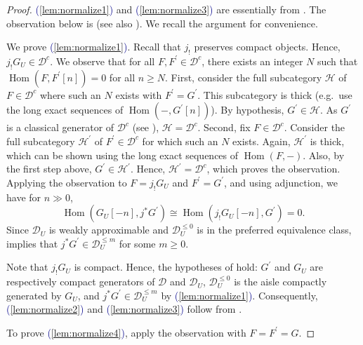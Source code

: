 \documentclass[11pt]{amsart}
\def\eqref#1{\textcolor{darkblue}{(\ref{#1})}}
\theoremstyle{plain}
\theoremstyle{definition}
\numberwithin{equation}{section}
\numberwithin{theorem}{section}
\begin{document}
\begin{proof}
    \eqref{lem:normalize1} and \eqref{lem:normalize3} are essentially from \cite[Lemma 3.11]{Burke/Neeman/Pauwels:2023}.
    The observation below is \cite[Lemma 3.5(2)]{Burke/Neeman/Pauwels:2023} (see also \cite[Lemma A.1]{GuisadoVillaalgordo/Lank:2026}). 
    We recall the argument for convenience.

    We prove \eqref{lem:normalize1}.
    Recall that $j_!$ preserves compact objects.
    Hence, $j_! G_U\in \mathcal{D}^c$.
    We observe that for all $F,F^\prime\in \mathcal{D}^c$, there exists an integer $N$ such that $\operatorname{Hom}(F,F^\prime[n])=0$ for all $n\geq N$.
    First, consider the full subcategory $\mathcal{H}$ of $F\in \mathcal{D}^c$ where such an $N$ exists with $F^\prime = G^\prime$.
    This subcategory is thick (e.g.\ use the long exact sequences of $\operatorname{Hom}(-,G^\prime[n])$). 
    By hypothesis, $G^\prime \in \mathcal{H}$.
    As $G^\prime$ is a classical generator of $\mathcal{D}^c$ (see ), $\mathcal{H} = \mathcal{D}^c$.
    Second, fix $F\in \mathcal{D}^c$. 
    Consider the full subcategory $\mathcal{H}^\prime$ of $F^\prime\in \mathcal{D}^c$ for which such an $N$ exists.
    Again, $\mathcal{H}^\prime$ is thick, which can be shown using the long exact sequences of $\operatorname{Hom}(F,-)$.
    Also, by the first step above, $G^\prime \in \mathcal{H}^\prime$. 
    Hence, $\mathcal{H}^\prime = \mathcal{D}^c$, which proves the observation. 
    Applying the observation to $F = j_! G_U$ and $F^\prime = G^\prime$, and using adjunction, we have for $n\gg 0$,
    \begin{displaymath}
        \operatorname{Hom}(G_U[-n],j^\ast G^\prime)\cong \operatorname{Hom}(j_! G_U[-n],G^\prime) = 0.
    \end{displaymath}
    Since $\mathcal{D}_U$ is weakly approximable and $\mathcal{D}_U^{\leq 0}$ is in the preferred equivalence class, \cite[Corollary 3.10(1)]{Burke/Neeman/Pauwels:2023} implies that $j^\ast G^\prime\in \mathcal{D}_U^{\leq m}$ for some $m\geq 0$.

    Note that $j_! G_U$ is compact. 
    Hence, the hypotheses of \cite[Lemma A.1]{GuisadoVillaalgordo/Lank:2026} hold: $G^\prime$ and $G_U$ are respectively compact generators of $\mathcal{D}$ and $\mathcal{D}_U$, $\mathcal{D}_U^{\leq 0}$ is the aisle compactly generated by $G_U$, and $j^\ast G^\prime\in \mathcal{D}_U^{\leq m}$ by \eqref{lem:normalize1}.
    Consequently, \eqref{lem:normalize2} and \eqref{lem:normalize3} follow from \cite[Lemma A.1]{GuisadoVillaalgordo/Lank:2026}.

    To prove \eqref{lem:normalize4}, apply the observation with $F=F^\prime=G$.
\end{proof}
\end{document}
